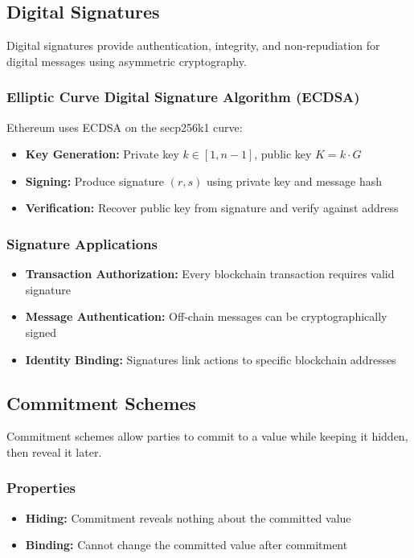 \subsection{Digital Signatures}

Digital signatures provide authentication, integrity, and non-repudiation for digital messages using asymmetric cryptography.

\subsubsection{Elliptic Curve Digital Signature Algorithm (ECDSA)}
Ethereum uses ECDSA on the secp256k1 curve:
\begin{itemize}
    \item \textbf{Key Generation:} Private key $k \in [1, n-1]$, public key $K = k \cdot G$
    \item \textbf{Signing:} Produce signature $(r, s)$ using private key and message hash
    \item \textbf{Verification:} Recover public key from signature and verify against address
\end{itemize}

\subsubsection{Signature Applications}
\begin{itemize}
    \item \textbf{Transaction Authorization:} Every blockchain transaction requires valid signature
    \item \textbf{Message Authentication:} Off-chain messages can be cryptographically signed
    \item \textbf{Identity Binding:} Signatures link actions to specific blockchain addresses
\end{itemize}

\subsection{Commitment Schemes}

Commitment schemes allow parties to commit to a value while keeping it hidden, then reveal it later.

\subsubsection{Properties}
\begin{itemize}
    \item \textbf{Hiding:} Commitment reveals nothing about the committed value
    \item \textbf{Binding:} Cannot change the committed value after commitment
\end{itemize}

